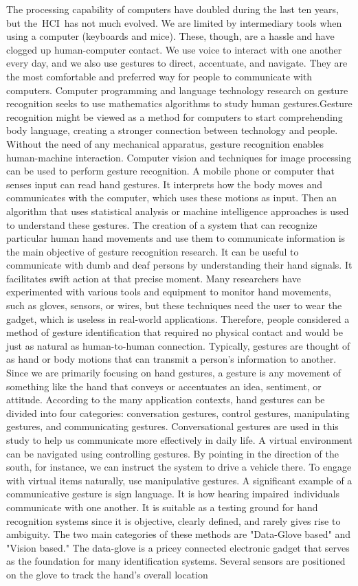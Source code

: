 \documentclass[fleqn, 11pt, twoside]{IOEGC}
\begin{document}
The processing capability of computers have doubled during the last ten years, but the HCI has not much evolved. We are limited by intermediary tools when using a computer (keyboards and mice). These, though, are a hassle and have clogged up human-computer contact. We use voice to interact with one another every day, and we also use gestures to direct, accentuate, and navigate. They are the most comfortable and preferred way for people to communicate with computers. Computer programming and language technology research on gesture recognition seeks to use mathematics algorithms to study human gestures.Gesture recognition might be viewed as a method for computers to start comprehending body language, creating a stronger connection between technology and people. Without the need of any mechanical apparatus, gesture recognition enables human-machine interaction. Computer vision and techniques for image processing can be used to perform gesture recognition. A mobile phone or computer that senses input can read hand gestures. It interprets how the body moves and communicates with the computer, which uses these motions as input. Then an algorithm that uses statistical analysis or machine intelligence approaches is used to understand these gestures. The creation of a system that can recognize particular human hand movements and use them to communicate information is the main objective of gesture recognition research. It can be useful to communicate with dumb and deaf persons by understanding their hand signals. It facilitates swift action at that precise moment. Many researchers have experimented with various tools and equipment to monitor hand movements, such as gloves, sensors, or wires, but these techniques need the user to wear the gadget, which is useless in real-world applications. Therefore, people considered a method of gesture identification that required no physical contact and would be just as natural as human-to-human connection. Typically, gestures are thought of as hand or body motions that can transmit a person's information to another. Since we are primarily focusing on hand gestures, a gesture is any movement of something like the hand that conveys or accentuates an idea, sentiment, or attitude. According to the many application contexts, hand gestures can be divided into four categories: conversation gestures, control gestures, manipulating gestures, and communicating gestures. Conversational gestures are used in this study to help us communicate more effectively in daily life. A virtual environment can be navigated using controlling gestures. By pointing in the direction of the south, for instance, we can instruct the system to drive a vehicle there. To engage with virtual items naturally, use manipulative gestures. A significant example of a communicative gesture is sign language. It is how hearing impaired individuals communicate with one another. It is suitable as a testing ground for hand recognition systems since it is objective, clearly defined, and rarely gives rise to ambiguity. The two main categories of these methods are "Data-Glove based" and "Vision based." The data-glove is a pricey connected electronic gadget that serves as the foundation for many identification systems. Several sensors are positioned on the glove to track the hand's overall location 
\end{document}
